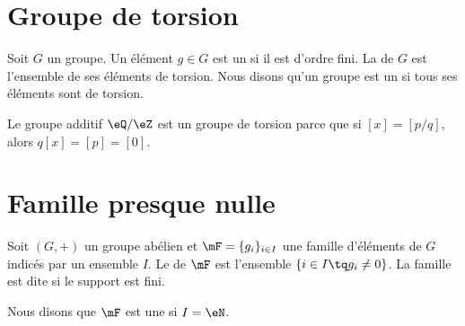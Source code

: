 \section{Groupe de torsion}

Soit \( G\) un groupe. Un élément \( g\in G\) est un  si il est d'ordre fini. La  de \( G\) est l'ensemble de ses éléments de torsion. Nous disons qu'un groupe est un  si tous ses éléments sont de torsion.

\begin{example}
	Le groupe additif \( \eQ/\eZ\) est un groupe de torsion parce que si \( [x]=[p/q]\), alors \( q[x]=[p]=[0]\).
\end{example}

\section{Famille presque nulle}

Soit \( (G,+)\) un groupe abélien et \( \mF=\{ g_i \}_{i\in I}\) une famille d'éléments de \( G\) indicés par un ensemble \( I\). Le  de \( \mF\) est l'ensemble \( \{ i\in I\tq g_i\neq 0 \}\). La famille est dite  si le support est fini.

Nous disons que \( \mF\) est une  si \( I=\eN\).
